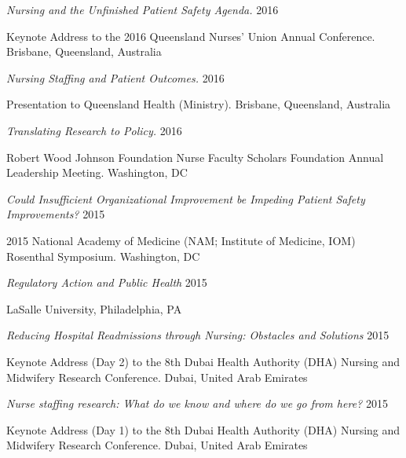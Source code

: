 \documentclass[10pt,]{article}
\begin{document}
{{{{{{{{{{{{{{{\begin{hangparas}{.5in}{1}
{\textit {Nursing and the Unfinished Patient Safety Agenda.}} \hfill 2016 
\vspace{-2.5mm}
\begin{adjustwidth}{0.5cm}{1cm}
Keynote Address to the 2016 Queensland Nurses’ Union Annual Conference. Brisbane, Queensland, Australia
\end{adjustwidth}

{\textit {Nursing Staffing and Patient Outcomes.}} \hfill 2016 
\vspace{-2.5mm}
\begin{adjustwidth}{0.5cm}{1cm}
Presentation to Queensland Health (Ministry). Brisbane, Queensland, Australia
\end{adjustwidth}

{\textit {Translating Research to Policy.}} \hfill 2016 
\vspace{-2.5mm}
\begin{adjustwidth}{0.5cm}{1cm}
Robert Wood Johnson Foundation Nurse Faculty Scholars Foundation Annual Leadership Meeting. Washington, DC
\end{adjustwidth}

 {\textit {Could Insufficient Organizational Improvement be Impeding Patient Safety Improvements?}} \hfill 2015 
\vspace{-2.5mm}
\begin{adjustwidth}{0.5cm}{1cm}
2015 National Academy of Medicine (NAM; Institute of Medicine, IOM) Rosenthal Symposium. Washington, DC
\end{adjustwidth}

{\textit {Regulatory Action and Public Health}} \hfill 2015 
\vspace{-2.5mm}
\begin{adjustwidth}{0.5cm}{1cm}
LaSalle University, Philadelphia, PA
\end{adjustwidth}

{\textit {Reducing Hospital Readmissions through Nursing: Obstacles and Solutions}} \hfill 2015 
\vspace{-2.5mm}
\begin{adjustwidth}{0.5cm}{1cm}
Keynote Address (Day 2) to the 8th Dubai Health Authority (DHA) Nursing and Midwifery Research Conference. Dubai, United Arab Emirates
\end{adjustwidth}

{\textit {Nurse staffing research: What do we know and where do we go from here?}} \hfill 2015 
\vspace{-2.5mm}
\begin{adjustwidth}{0.5cm}{1cm}
Keynote Address (Day 1) to the 8th Dubai Health Authority (DHA) Nursing and Midwifery Research Conference. Dubai, United Arab Emirates
\end{adjustwidth}


\end{hangparas}}}}}}}}}}}}}}}}
\end{document}
